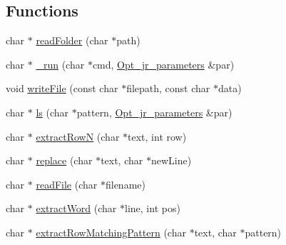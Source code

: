 \subsection*{Functions}
\begin{DoxyCompactItemize}
\item 
char $\ast$ \hyperlink{invoke__predictor__helper_8hh_a28d1d79b02f44f349115bf4c9e754770}{read\-Folder} (char $\ast$path)
\item 
char $\ast$ \hyperlink{invoke__predictor__helper_8hh_adf7027b4f2f1de8770f5bee085e8db7c}{\-\_\-run} (char $\ast$cmd, \hyperlink{classOpt__jr__parameters}{Opt\-\_\-jr\-\_\-parameters} \&par)
\item 
void \hyperlink{invoke__predictor__helper_8hh_a7eb7b34e9ea84bfbed4afbf5f63dd024}{write\-File} (const char $\ast$filepath, const char $\ast$data)
\item 
char $\ast$ \hyperlink{invoke__predictor__helper_8hh_a80d09552b3ce875c810f74a5300dee30}{ls} (char $\ast$pattern, \hyperlink{classOpt__jr__parameters}{Opt\-\_\-jr\-\_\-parameters} \&par)
\item 
char $\ast$ \hyperlink{invoke__predictor__helper_8hh_af8e06c5020e70e2f740101fc7bed6fea}{extract\-Row\-N} (char $\ast$text, int row)
\item 
char $\ast$ \hyperlink{invoke__predictor__helper_8hh_a66e21ca5b85d790af9025eb13f4beca5}{replace} (char $\ast$text, char $\ast$new\-Line)
\item 
char $\ast$ \hyperlink{invoke__predictor__helper_8hh_aec83b878d49ef5976f2175867cdc2d82}{read\-File} (char $\ast$filename)
\item 
char $\ast$ \hyperlink{invoke__predictor__helper_8hh_af6244416f7b414764278d2f5cdfe262c}{extract\-Word} (char $\ast$line, int pos)
\item 
char $\ast$ \hyperlink{invoke__predictor__helper_8hh_abf4e66cc6aa015a35688c049d4f72ade}{extract\-Row\-Matching\-Pattern} (char $\ast$text, char $\ast$pattern)
\end{DoxyCompactItemize}


